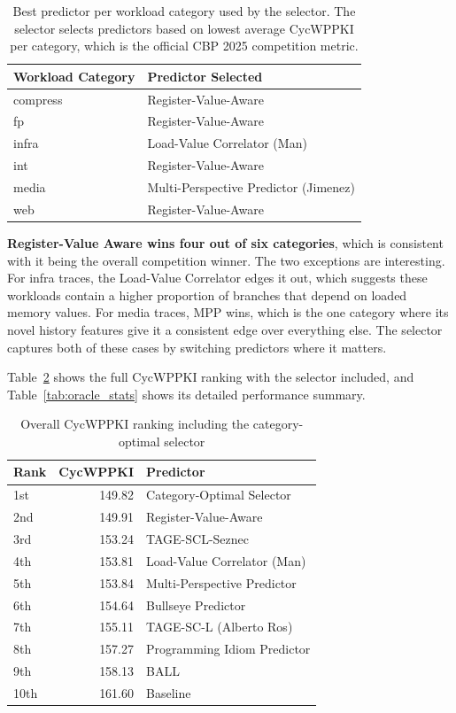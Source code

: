 \documentclass[11pt,a4paper]{article}
\begin{document}
\begin{table}[H]
\centering
\caption{Best predictor per workload category used by the selector. The selector selects predictors based on lowest average CycWPPKI per category, which is the official CBP 2025 competition metric.}
\label{tab:oracle_winners}
\begin{tabular}{ll}
\toprule
\textbf{Workload Category} & \textbf{Predictor Selected} \\
\midrule
compress & Register-Value-Aware \\
fp       & Register-Value-Aware \\
infra    & Load-Value Correlator (Man) \\
int      & Register-Value-Aware \\
media    & Multi-Perspective Predictor (Jimenez) \\
web      & Register-Value-Aware \\
\bottomrule
\end{tabular}
\end{table}

\textbf{Register-Value Aware wins four out of six categories}, which is consistent with
it being the overall competition winner. The two exceptions are interesting. For
infra traces, the Load-Value Correlator edges it out, which suggests these
workloads contain a higher proportion of branches that depend on loaded memory
values. For media traces, MPP wins, which is the one category where its novel
history features give it a consistent edge over everything else. The selector
captures both of these cases by switching predictors where it matters.

Table~\ref{tab:oracle_results} shows the full CycWPPKI ranking with the selector
included, and Table~\ref{tab:oracle_stats} shows its detailed performance summary.

\begin{table}[H]
\centering
\caption{Overall CycWPPKI ranking including the category-optimal selector}
\label{tab:oracle_results}
\begin{tabular}{lrl}
\toprule
\textbf{Rank} & \textbf{CycWPPKI} & \textbf{Predictor} \\
\midrule
1st  & 149.82 & Category-Optimal Selector \\
2nd  & 149.91 & Register-Value-Aware \\
3rd  & 153.24 & TAGE-SCL-Seznec \\
4th  & 153.81 & Load-Value Correlator (Man) \\
5th  & 153.84 & Multi-Perspective Predictor \\
6th  & 154.64 & Bullseye Predictor \\
7th  & 155.11 & TAGE-SC-L (Alberto Ros) \\
8th  & 157.27 & Programming Idiom Predictor \\
9th  & 158.13 & BALL \\
10th & 161.60 & Baseline \\
\bottomrule
\end{tabular}
\end{table}
\end{document}

